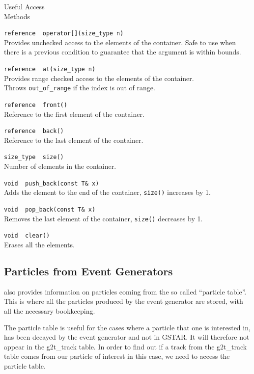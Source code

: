 \begin{Entry}

\item[Useful Access \\Methods]

  \verb+reference  operator[](size_type n)+\\
  Provides unchecked access to the elements of the container.  Safe
  to use when there is a previous condition to guarantee that
  the argument is within bounds.

  \verb+reference  at(size_type n)+\\
  Provides range checked access to the elements of the container.\\
  Throws {\tt out\_of\_range} if the index is out of range.

  \verb+reference  front()+\\
   Reference to the first element of the container.
  
  \verb+reference  back()+\\
   Reference to the last element of the container.

  \verb+size_type  size()+\\
   Number of elements in the container.  

  \verb+void  push_back(const T& x)+\\
  Adds the element to the end of the container, {\tt size()} increases
  by 1.

  \verb+void  pop_back(const T& x)+\\
  Removes the last element of the container, {\tt size()} decreases
  by 1.

  \verb+void  clear()+\\
  Erases all the elements.

\end{Entry}


\subsection{Particles from Event Generators}
\label{sec:particle}

\StMcEvent also provides information on particles coming from the so
called ``particle table''.  This is where all the particles produced
by the event generator are stored, with all the necessary bookkeeping.

The particle table is useful for the cases where a particle that one is
interested in, has been decayed by the event generator and not in
GSTAR.  It will therefore not appear in the g2t\_track table.  In
order to find out if a track from the g2t\_track table comes from
our particle of interest in this case, we need to access the particle
table.

